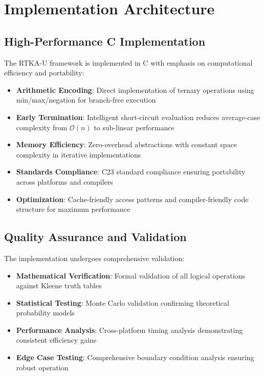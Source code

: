 \documentclass[11pt,a4paper]{article}
\begin{document}
\section{Implementation Architecture}

\subsection{High-Performance C Implementation}

The RTKA-U framework is implemented in C with emphasis on computational efficiency and portability:

\begin{itemize}
\item \textbf{Arithmetic Encoding}: Direct implementation of ternary operations using min/max/negation for branch-free execution
\item \textbf{Early Termination}: Intelligent short-circuit evaluation reduces average-case complexity from $\mathcal{O}(n)$ to sub-linear performance
\item \textbf{Memory Efficiency}: Zero-overhead abstractions with constant space complexity in iterative implementations
\item \textbf{Standards Compliance}: C23 standard compliance ensuring portability across platforms and compilers
\item \textbf{Optimization}: Cache-friendly access patterns and compiler-friendly code structure for maximum performance
\end{itemize}

\subsection{Quality Assurance and Validation}

The implementation undergoes comprehensive validation:

\begin{itemize}
\item \textbf{Mathematical Verification}: Formal validation of all logical operations against Kleene truth tables
\item \textbf{Statistical Testing}: Monte Carlo validation confirming theoretical probability models
\item \textbf{Performance Analysis}: Cross-platform timing analysis demonstrating consistent efficiency gains
\item \textbf{Edge Case Testing}: Comprehensive boundary condition analysis ensuring robust operation
\end{itemize}
\end{document}
